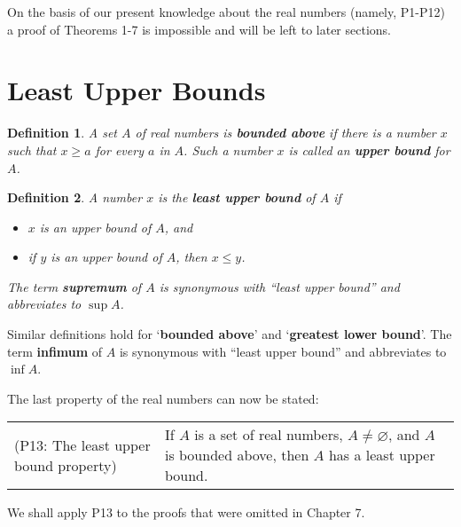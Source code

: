 \documentclass{article}
\numberwithin{corollary}{subsection}
\numberwithin{definition}{subsection}
\newtheorem*{definition*}{Definition}
\numberwithin{lemma}{subsection}
\numberwithin{theorem}{subsection}
\begin{document}
On the basis of our present knowledge about the real numbers (namely, P1-P12)
a proof of Theorems 1-7 is impossible and will be left to later
sections.

\section{Least Upper Bounds}

\begin{definition*}
  A set $A$ of real numbers is \textbf{bounded above} if there is a number $x$
  such that $x \geq a$ for every $a$ in $A$. Such a number $x$ is called an
  \textbf{upper bound} for $A$.
\end{definition*}

\begin{definition*}
  A number $x$ is the \textbf{least upper bound} of $A$ if
  \begin{itemize}
    \item $x$ is an upper bound of $A$, and
    \item if $y$ is an upper bound of $A$, then $x \leq y$.
  \end{itemize}

  The term \textbf{supremum} of $A$ is synonymous with ``least upper bound''
  and abbreviates to $\sup A$.
\end{definition*}

Similar definitions hold for `\textbf{bounded above}' and `\textbf{greatest
lower bound}'. The term \textbf{infimum} of $A$ is synonymous with ``least
upper bound'' and abbreviates to $\inf A$. \newline

The last property of the real numbers can now be stated:

\begin{tabular}{l p{1.5in}}
  (P13: The least upper bound property) & If $A$ is a set of real numbers, $A
  \neq \varnothing$, and $A$ is bounded above, then $A$ has a least upper
  bound.
\end{tabular}

We shall apply P13 to the proofs that were omitted in Chapter 7.
\end{document}

